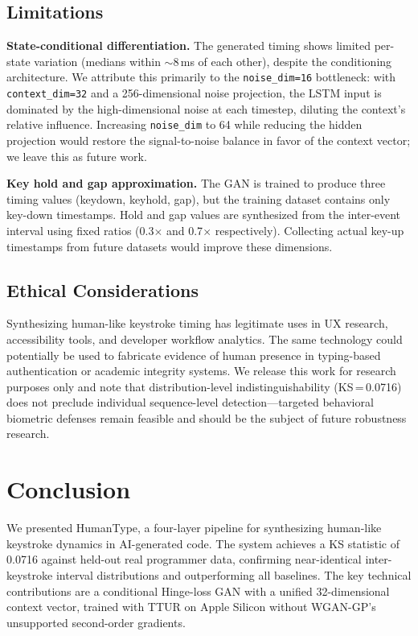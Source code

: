 \documentclass[sigconf,nonacm]{acmart}
\begin{document}
\subsection{Limitations}
\label{sec:limit}

\textbf{State-conditional differentiation.}
The generated timing shows limited per-state variation
(medians within $\sim$8\,ms of each other), despite the conditioning architecture.
We attribute this primarily to the \texttt{noise\_dim=16} bottleneck: with
\texttt{context\_dim=32} and a 256-dimensional noise projection, the LSTM input
is dominated by the high-dimensional noise at each timestep, diluting the context's
relative influence.
Increasing \texttt{noise\_dim} to 64 while reducing the hidden projection would restore
the signal-to-noise balance in favor of the context vector; we leave this as future work.

\textbf{Key hold and gap approximation.}
The GAN is trained to produce three timing values (keydown, keyhold, gap), but the
training dataset contains only key-down timestamps. Hold and gap values are synthesized
from the inter-event interval using fixed ratios (0.3$\times$ and 0.7$\times$
respectively). Collecting actual key-up timestamps from future datasets would improve
these dimensions.

\subsection{Ethical Considerations}

Synthesizing human-like keystroke timing has legitimate uses in UX research,
accessibility tools, and developer workflow analytics.
The same technology could potentially be used to fabricate evidence of human presence
in typing-based authentication or academic integrity systems.
We release this work for research purposes only and note that distribution-level
indistinguishability (KS\,=\,0.0716) does not preclude individual sequence-level
detection---targeted behavioral biometric defenses remain feasible and should be
the subject of future robustness research.


\section{Conclusion}

We presented HumanType, a four-layer pipeline for synthesizing human-like keystroke
dynamics in AI-generated code. The system achieves a KS statistic of 0.0716 against
held-out real programmer data, confirming near-identical inter-keystroke interval
distributions and outperforming all baselines.
The key technical contributions are a conditional Hinge-loss GAN with a unified
32-dimensional context vector, trained with TTUR on Apple Silicon without WGAN-GP's
unsupported second-order gradients.
\end{document}
